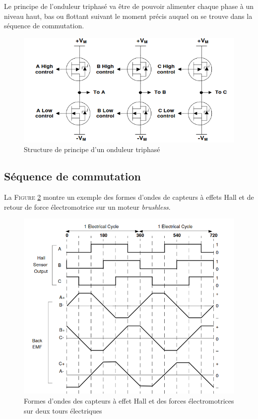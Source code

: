 		Le principe de l'onduleur triphasé va être de pouvoir
		alimenter chaque phase à un niveau haut, bas ou flottant
		suivant le moment précis auquel on se trouve dans la 
		séquence de commutation.
		
		\begin{figure}[h]
			\begin{center}
				\includegraphics[scale=0.8]{../Illus/bridge_princ.png}
			\end{center}
			\caption{Structure de principe d'un onduleur triphasé}
			\label{bridge_princ}
		\end{figure}
		
		\newpage
	
		\subsection{Séquence de commutation}
		
		La \textsc{Figure \ref{waveforms}} montre un exemple
		des formes d'ondes de capteurs à effets Hall et de
		retour de force électromotrice sur un moteur \textit{brushless}.
		
		\begin{figure}[h]
			\begin{center}
				\includegraphics[scale=0.7]{../Illus/waveforms.png}
			\end{center}
			\caption{Formes d'ondes des capteurs à effet Hall et des forces électromotrices sur
			deux tours électriques}
			\label{waveforms}
		\end{figure}
		
